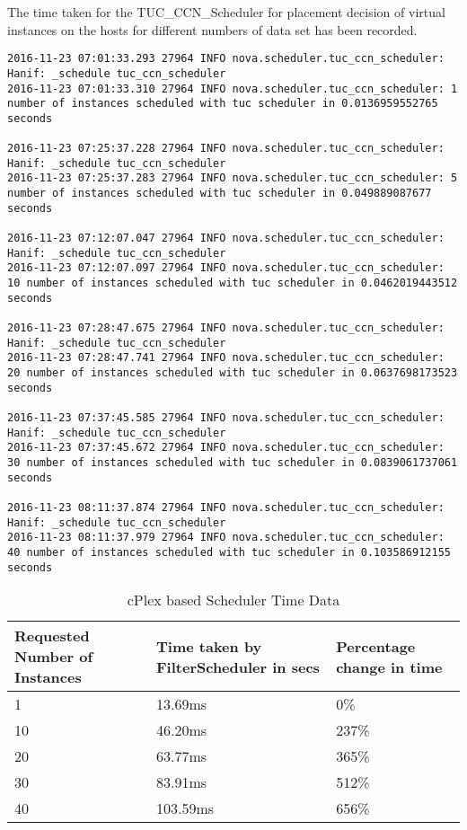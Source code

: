 The time taken for the TUC\_CCN\_Scheduler for placement decision of virtual instances on the hosts for different numbers of data set has been recorded.
\newline
\begin{lstlisting}[frame=single, caption={The tuc\_ccn\_scheduler scheduler based time logs for scheduling different amounts of virtual instances}, label={lst:tucschedulerlogdata}]
2016-11-23 07:01:33.293 27964 INFO nova.scheduler.tuc_ccn_scheduler: Hanif: _schedule tuc_ccn_scheduler
2016-11-23 07:01:33.310 27964 INFO nova.scheduler.tuc_ccn_scheduler: 1 number of instances scheduled with tuc scheduler in 0.0136959552765 seconds

2016-11-23 07:25:37.228 27964 INFO nova.scheduler.tuc_ccn_scheduler: Hanif: _schedule tuc_ccn_scheduler
2016-11-23 07:25:37.283 27964 INFO nova.scheduler.tuc_ccn_scheduler: 5 number of instances scheduled with tuc scheduler in 0.049889087677 seconds

2016-11-23 07:12:07.047 27964 INFO nova.scheduler.tuc_ccn_scheduler: Hanif: _schedule tuc_ccn_scheduler
2016-11-23 07:12:07.097 27964 INFO nova.scheduler.tuc_ccn_scheduler: 10 number of instances scheduled with tuc scheduler in 0.0462019443512 seconds

2016-11-23 07:28:47.675 27964 INFO nova.scheduler.tuc_ccn_scheduler: Hanif: _schedule tuc_ccn_scheduler
2016-11-23 07:28:47.741 27964 INFO nova.scheduler.tuc_ccn_scheduler: 20 number of instances scheduled with tuc scheduler in 0.0637698173523 seconds

2016-11-23 07:37:45.585 27964 INFO nova.scheduler.tuc_ccn_scheduler: Hanif: _schedule tuc_ccn_scheduler
2016-11-23 07:37:45.672 27964 INFO nova.scheduler.tuc_ccn_scheduler: 30 number of instances scheduled with tuc scheduler in 0.0839061737061 seconds

2016-11-23 08:11:37.874 27964 INFO nova.scheduler.tuc_ccn_scheduler: Hanif: _schedule tuc_ccn_scheduler
2016-11-23 08:11:37.979 27964 INFO nova.scheduler.tuc_ccn_scheduler: 40 number of instances scheduled with tuc scheduler in 0.103586912155 seconds
\end{lstlisting}

\begin{table}[!htb]
	\centering
		\begin{tabular}{|| p{10em} | p{10em} | p{10em} ||}
			\hline
			{Requested Number of Instances} & {Time taken by FilterScheduler in secs} & {Percentage change in time} \\ [1ex] 
			\hline
			1  & 13.69ms  & 0\% \\
			\hline
			10 & 46.20ms  & 237\% \\
			\hline
			20 & 63.77ms  & 365\% \\
			\hline
			30 & 83.91ms  & 512\% \\
			\hline
			40 & 103.59ms & 656\% \\
			\hline
		\end{tabular}
	\caption{cPlex based Scheduler Time Data}\label{tab:tucschedulerlogdata}
\end{table}

